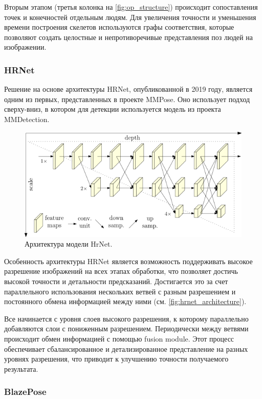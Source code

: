 Вторым этапом (третья колонка на \autoref{fig:op_structure}) происходит сопоставления точек и конечностей отдельным людям. Для увеличения точности и уменьшения времени построения скелетов используются графы соответствия, которые позволяют создать целостные и непротиворечивые представления поз людей на изображении.

\subsubsection*{HRNet}

Решение на основе архитектуры HRNet, опубликованной в 2019 году, является одним из первых, представленных в проекте MMPose. Оно использует подход сверху-вниз, в котором для детекции используется модель из проекта MMDetection.

\begin{figure}[h]
	\centering
	\includegraphics[width=.9\textwidth]{./images/hrnet_architecture}
	\caption{Архитектура модели HrNet. \cite{hrnet}}
	\label{fig:hrnet_architecture}
\end{figure}

Особенность архитектуры HRNet является возможность поддерживать высокое разрешение изображений на всех этапах обработки, что позволяет достичь высокой точности и детальности предсказаний. Достигается это за счет параллельного использования нескольких ветвей с разным разрешением и постоянного обмена информацией между ними (см. \autoref{fig:hrnet_architecture}).

Все начинается с уровня слоев высокого разрешения, к которому параллельно добавляются слои с пониженным разрешением. Периодически между ветвями происходит обмен  информацией с помощью fusion module. Этот процесс обеспечивает сбалансированное и детализированное представление на разных уровнях разрешения, что приводит к улучшению точности получаемого результата.

\subsubsection*{BlazePose}

